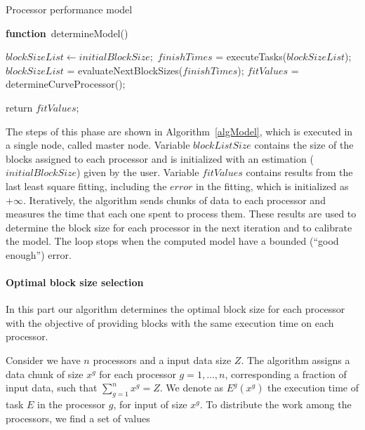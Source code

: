 \documentclass[journal]{IEEEtran}
\begin{document}
\begin{algorithm}

\caption{Processor performance model}
\label{algModel}

\begin{algorithmic}		

\STATE \textbf{function}~determineModel()

\STATE $blockSizeList \leftarrow initialBlockSize;$
		\STATE $finishTimes$ = executeTasks($blockSizeList$);
	        \STATE $blockSizeList$ = evaluateNextBlockSizes($finishTimes$);
		\STATE $fitValues$ = determineCurveProcessor();
\ENDWHILE

return $fitValues$;

\end{algorithmic}
\end{algorithm}


The steps of this phase are shown in Algorithm~\ref{algModel}, which is executed
in a single node, called master node. Variable $blockListSize$ contains the size
of the blocks assigned to each processor and is initialized with an estimation
($initialBlockSize$) given by the user. Variable $fitValues$ contains
results from the last least square fitting, including the $error$ in the
fitting, which is initialized as $+\infty$. Iteratively, the algorithm sends chunks of data to each processor and measures the time that each one spent to process them.  These results are used to determine the block size for each processor in the next iteration and to calibrate the model. The loop stops when the computed model have a bounded (``good enough'') error.

\vspace{0.2cm}
\paragraph*{Optimal block size selection} In this part our algorithm determines 
the optimal block size for each processor with the objective of providing blocks
with the same execution time on each processor.

Consider we have $n$ processors and a input data size $Z$. The algorithm assigns
a data chunk of size $x^g$ for each processor $g=1,...,n$, corresponding a
fraction of input data, such that $\sum_{g=1}^n x^g = Z$. We denote as
$E^g(x^g)$ the execution time of task $E$ in the processor $g$, for input of
size $x^g$. To distribute the work among the processors, we find a set of values
	
\end{document}
